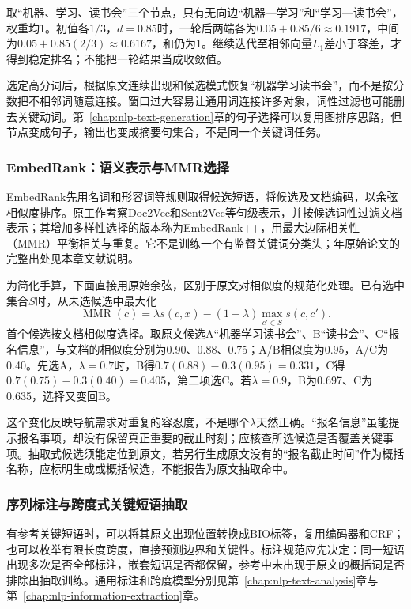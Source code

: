 取“机器、学习、读书会”三个节点，只有无向边“机器—学习”和“学习—读书会”，权重均1。初值各$1/3$，$d=0.85$时，一轮后两端各为$0.05+0.85/6\approx0.1917$，中间为$0.05+0.85(2/3)\approx0.6167$，和仍为1。继续迭代至相邻向量$L_1$差小于容差，才得到稳定排名；不能把一轮结果当成收敛值。

选定高分词后，根据原文连续出现和候选模式恢复“机器学习读书会”，而不是按分数把不相邻词随意连接。窗口过大容易让通用词连接许多对象，词性过滤也可能删去关键动词。第~\ref{chap:nlp-text-generation}章的句子选择可以复用图排序思路，但节点变成句子，输出也变成摘要句集合，不是同一个关键词任务。

\subsubsection{EmbedRank：语义表示与MMR选择}
\label{sec:nlp-classification-embedrank}

EmbedRank先用名词和形容词等规则取得候选短语，将候选及文档编码，以余弦相似度排序。原工作考察Doc2Vec和Sent2Vec等句级表示，并按候选词性过滤文档表示；其增加多样性选择的版本称为EmbedRank++，用最大边际相关性（MMR）平衡相关与重复。它不是训练一个有监督关键词分类头；\citeyear{nlp-bennani2018embedrank}年原始论文的完整出处见本章文献说明。

为简化手算，下面直接用原始余弦，区别于原文对相似度的规范化处理。已有选中集合$S$时，从未选候选中最大化
\[
 \operatorname{MMR}(c)=\lambda s(c,x)
 -(1-\lambda)\max_{c'\in S}s(c,c').
\]
首个候选按文档相似度选择。取原文候选A“机器学习读书会”、B“读书会”、C“报名信息”，与文档的相似度分别为0.90、0.88、0.75；A/B相似度为0.95，A/C为0.40。先选A，$\lambda=0.7$时，B得$0.7(0.88)-0.3(0.95)=0.331$，C得$0.7(0.75)-0.3(0.40)=0.405$，第二项选C。若$\lambda=0.9$，B为0.697、C为0.635，选择又变回B。

这个变化反映导航需求对重复的容忍度，不是哪个$\lambda$天然正确。“报名信息”虽能提示报名事项，却没有保留真正重要的截止时刻；应核查所选候选是否覆盖关键事项。抽取式候选须能定位到原文，若另行生成原文没有的“报名截止时间”作为概括名称，应标明生成或概括候选，不能报告为原文抽取命中。

\subsubsection{序列标注与跨度式关键短语抽取}
\label{sec:nlp-classification-keyphrase-spans}

有参考关键短语时，可以将其原文出现位置转换成BIO标签，复用编码器和CRF；也可以枚举有限长度跨度，直接预测边界和关键性。标注规范应先决定：同一短语出现多次是否全部标注，嵌套短语是否都保留，参考中未出现于原文的概括词是否排除出抽取训练。通用标注和跨度模型分别见第~\ref{chap:nlp-text-analysis}章与第~\ref{chap:nlp-information-extraction}章。

